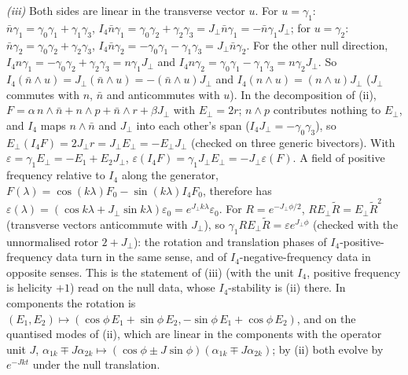 \emph{(iii)} Both sides are linear in the transverse vector $u$. For $u = \gamma_{1}$: $\bar n\gamma_{1} = \gamma_{0}\gamma_{1} + \gamma_{1}\gamma_{3}$, $I_{4}\bar n\gamma_{1} = \gamma_{0}\gamma_{2} + \gamma_{2}\gamma_{3} = J_{\perp}\bar n\gamma_{1} = -\bar n\gamma_{1}J_{\perp}$; for $u = \gamma_{2}$: $\bar n\gamma_{2} = \gamma_{0}\gamma_{2} + \gamma_{2}\gamma_{3}$, $I_{4}\bar n\gamma_{2} = -\gamma_{0}\gamma_{1} - \gamma_{1}\gamma_{3} = J_{\perp}\bar n\gamma_{2}$. For the other null direction, $I_{4}n\gamma_{1} = -\gamma_{0}\gamma_{2} + \gamma_{2}\gamma_{3} = n\gamma_{1}J_{\perp}$ and $I_{4}n\gamma_{2} = \gamma_{0}\gamma_{1} - \gamma_{1}\gamma_{3} = n\gamma_{2}J_{\perp}$. So $I_{4}(\bar n\wedge u) = J_{\perp}(\bar n\wedge u) = -(\bar n\wedge u)J_{\perp}$ and $I_{4}(n\wedge u) = (n\wedge u)J_{\perp}$ ($J_{\perp}$ commutes with $n$, $\bar n$ and anticommutes with $u$). In the decomposition of (ii), $F = \alpha\,n\wedge\bar n + n\wedge p + \bar n\wedge r + \beta J_{\perp}$ with $E_{\perp} = 2r$; $n\wedge p$ contributes nothing to $E_{\perp}$, and $I_{4}$ maps $n\wedge\bar n$ and $J_{\perp}$ into each other's span ($I_{4}J_{\perp} = -\gamma_{0}\gamma_{3}$), so $E_{\perp}(I_{4}F) = 2J_{\perp}r = J_{\perp}E_{\perp} = -E_{\perp}J_{\perp}$ (checked on three generic bivectors). With $\varepsilon = \gamma_{1}E_{\perp} = -E_{1} + E_{2}J_{\perp}$, $\varepsilon(I_{4}F) = \gamma_{1}J_{\perp}E_{\perp} = -J_{\perp}\varepsilon(F)$. A field of positive frequency relative to $I_{4}$ along the generator, $F(\lambda) = \cos(k\lambda)F_{0} - \sin(k\lambda)I_{4}F_{0}$, therefore has $\varepsilon(\lambda) = (\cos k\lambda + J_{\perp}\sin k\lambda)\varepsilon_{0} = e^{J_{\perp}k\lambda}\varepsilon_{0}$. For $R = e^{-J_{\perp}\phi/2}$, $RE_{\perp}\tilde R = E_{\perp}\tilde R^{2}$ (transverse vectors anticommute with $J_{\perp}$), so $\gamma_{1}RE_{\perp}\tilde R = \varepsilon e^{J_{\perp}\phi}$ (checked with the unnormalised rotor $2 + J_{\perp}$): the rotation and translation phases of $I_{4}$-positive-frequency data turn in the same sense, and of $I_{4}$-negative-frequency data in opposite senses. This is the statement of (iii) (with the unit $I_{4}$, positive frequency is helicity $+1$) read on the null data, whose $I_{4}$-stability is (ii) there. In components the rotation is $(E_{1}, E_{2}) \mapsto (\cos\phi\,E_{1} + \sin\phi\,E_{2}, -\sin\phi\,E_{1} + \cos\phi\,E_{2})$, and on the quantised modes of (ii), which are linear in the components with the operator unit $J$, $\alpha_{1k} \mp J\alpha_{2k} \mapsto (\cos\phi \pm J\sin\phi)(\alpha_{1k} \mp J\alpha_{2k})$; by (ii) both evolve by $e^{-Jkt}$ under the null translation.

